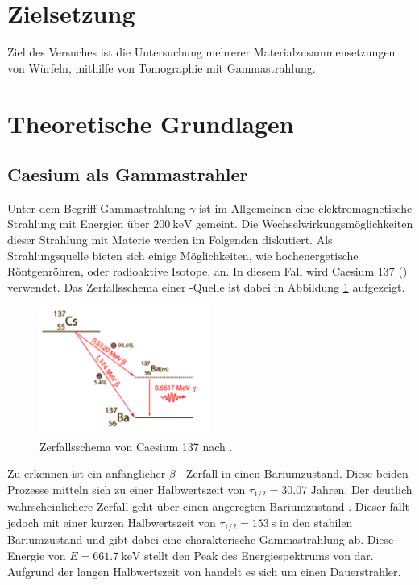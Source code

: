 \section{Zielsetzung}
Ziel des Versuches ist die Untersuchung mehrerer Materialzusammensetzungen von Würfeln, mithilfe von Tomographie mit Gammastrahlung.

\section{Theoretische Grundlagen}

\subsection{Caesium als Gammastrahler}
Unter dem Begriff Gammastrahlung $\gamma$ ist im Allgemeinen eine elektromagnetische Strahlung mit Energien über $\SI{200}{\kilo\electronvolt}$ gemeint. 
Die Wechselwirkungsmöglichkeiten dieser Strahlung mit Materie werden im Folgenden diskutiert. Als Strahlungsquelle bieten sich einige Möglichkeiten, wie hochenergetische Röntgenröhren, oder radioaktive Isotope, an. 
In diesem Fall wird Caesium 137 () verwendet. Das Zerfallsschema einer -Quelle ist dabei in Abbildung \ref{fig:decay} aufgezeigt.
\begin{figure}
    \centering
    \includegraphics[width=0.5\textwidth]{bilder/decay.png}
    \caption{Zerfallsschema von Caesium 137 nach \cite{decay}.}
    \label{fig:decay}
\end{figure}
Zu erkennen ist ein anfänglicher $\beta^{-}$-Zerfall in einen Bariumzustand. 
Diese beiden Prozesse mitteln sich zu einer Halbwertszeit von $\tau_{1\text{/}2} = 30.07 \text{ Jahren}$. Der deutlich wahrscheinlichere Zerfall geht über einen angeregten Bariumzustand . 
Dieser fällt jedoch mit einer kurzen Halbwertszeit von $\tau_{1\text{/}2} = \SI{153}{\second}$ in den stabilen Bariumzustand und gibt dabei eine charakterische Gammastrahlung ab. 
Diese Energie von $E = \SI{661.7}{\kilo\electronvolt}$ stellt den Peak des Energiespektrums von  dar. Aufgrund der langen Halbwertszeit von  handelt es sich um einen Dauerstrahler.
